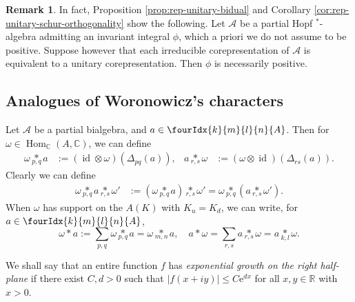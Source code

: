 \documentclass[11pt]{article}
\DeclareMathOperator{\id}{id}
\DeclareMathOperator{\Hom}{Hom}
\newcommand{\C}{\mathbb{C}}
\newcommand{\R}{\mathbb{R}}
\newcommand{\Gr}[5]{\fourIdx{#2}{#4}{#3}{#5}{#1}}%
\newcommand{\aste}[1]{\underset{#1}{\ast}}
\theoremstyle{definition}
\newtheorem{Rem}[Theorem]{Remark}
\numberwithin{equation}{section}
\begin{document}
\begin{Rem}\label{RemPos} In fact, Proposition \ref{prop:rep-unitary-bidual} and Corollary \ref{cor:rep-unitary-schur-orthogonality} show the following. Let $\mathscr{A}$ be a partial Hopf $^*$-algebra admitting an invariant integral $\phi$, which a priori we do not assume to be positive. Suppose however that each irreducible corepresentation of $\mathscr{A}$ is equivalent to a unitary corepresentation. Then $\phi$ is necessarily positive.
\end{Rem} 

\subsection{Analogues of Woronowicz's  characters}

Let $\mathscr{A}$ be a partial bialgebra, and $a\in \Gr{A}{k}{l}{m}{n}$. Then for $\omega \in \Hom_{\C}(A,\C)$, we can define
\begin{align*}
  \omega \aste{p,q} a
&:= (\id \otimes \omega) (\Delta_{pq}(a)), & a \aste{r,s}
\omega&:=(\omega \otimes \id)(\Delta_{rs}(a)).\end{align*} Clearly we can define
\begin{align*} \omega \aste{p,q} a \aste{r,s}
\omega'&:= (\omega \aste{p,q} a)\aste{r,s} \omega' = \omega \aste{p,q}(a \aste{r,s} \omega').\end{align*}
When $\omega$ has support on the $A(K)$ with $K_u=K_d$, we can write, for $a\in \Gr{A}{k}{l}{m}{n}$, \[\omega\ast a := \sum_{p,q} \omega\aste{p,q}a = \omega\aste{m,n}a,\quad  a\ast \omega = \sum_{r,s} a\aste{r,s}\omega = a\aste{k,l}\omega.\] 

We shall say that an entire function $f$ has \emph{exponential growth
  on the right half-plane} if there exist $C,d>0$ such that $|f(x+iy)|\leq
C\mathrm{e}^{dx}$  for all $x,y\in \R$ with $x>0$. 
\end{document}
